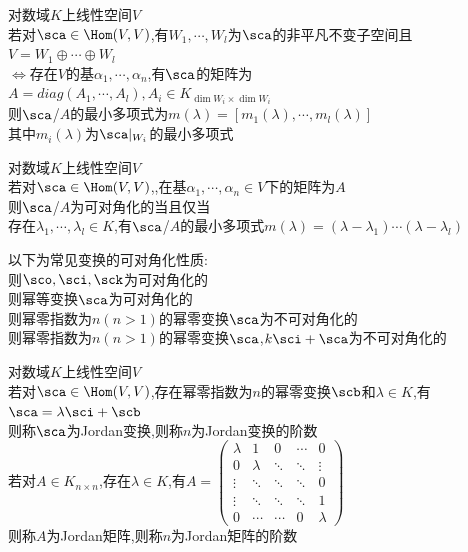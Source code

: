 \begin{dingli}
对数域$K$上线性空间$V$\\
若对$\sca\in \Hom(V,V)$,有$W_1,\cdots,W_l$为$\sca$的非平凡不变子空间且$V=W_1\oplus\cdots\oplus W_l$\\
$\Leftrightarrow$存在$V$的基$\alpha_1,\cdots,\alpha_n$,有$\sca$的矩阵为$A=diag(A_1,\cdots,A_l),A_i\in K_{\dim W_i\times\dim W_i}$\\
则$\sca$/$A$的最小多项式为$m(\lambda)=[m_1(\lambda),\cdots,m_l(\lambda)]$\\
其中$m_i(\lambda)$为$\sca|_{W_i}$的最小多项式
\end{dingli}

\begin{dingli}
对数域$K$上线性空间$V$\\
若对$\sca\in \Hom(V,V)$,,在基$\alpha_1,\cdots,\alpha_n\in V$下的矩阵为$A$\\
则$\sca$/$A$为可对角化的当且仅当\\
存在$\lambda_1,\cdots,\lambda_l\in K$,有$\sca$/$A$的最小多项式$m(\lambda)=(\lambda-\lambda_1)\cdots(\lambda-\lambda_l)$
\end{dingli}

\begin{zhu}
以下为常见变换的可对角化性质:\\
则$\sco,\sci,\sck$为可对角化的\\
则幂等变换$\sca$为可对角化的\\
则幂零指数为$n(n>1)$的幂零变换$\sca$为不可对角化的\\
则幂零指数为$n(n>1)$的幂零变换$\sca$,$k\sci+\sca$为不可对角化的
\end{zhu}

\begin{dingyi}
对数域$K$上线性空间$V$\\
若对$\sca\in \Hom(V,V)$,存在幂零指数为$n$的幂零变换$\scb$和$\lambda\in K$,有$\sca=\lambda\sci+\scb$\\
则称$\sca$为Jordan变换,则称$n$为Jordan变换的阶数\\
若对$A\in K_{n\times n}$,存在$\lambda\in K$,有$A=\begin{pmatrix} \lambda&1&0&\cdots&0\\ 0&\lambda&\ddots&\ddots&\vdots\\ \vdots&\ddots&\ddots&\ddots&0\\ \vdots&\ddots&\ddots&\ddots&1\\ 0&\cdots&\cdots&0&\lambda\end{pmatrix}$\\
则称$A$为Jordan矩阵,则称$n$为Jordan矩阵的阶数
\end{dingyi}

